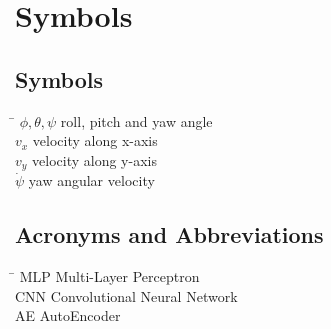 \chapter*{Symbols}
\label{sec:symbols}

\section*{Symbols}
\begin{tabbing}
 \hspace*{2.0cm} \= \kill
  $\phi, \theta, \psi$    \> roll, pitch and yaw angle \\[0.5ex]
  $v_x$         \> velocity along x-axis \\[0.5ex]
  $v_y$         \> velocity along y-axis \\[0.5ex]
  $\dot{\psi}$  \> yaw angular velocity \\[0.5ex]
\end{tabbing}

\section*{Acronyms and Abbreviations}
\begin{tabbing}
 \hspace*{2.0cm} \= \kill
 MLP \> Multi-Layer Perceptron \\[0.5ex]
 CNN \> Convolutional Neural Network \\[0.5ex]
 AE \> AutoEncoder \\[0.5ex]

\end{tabbing}